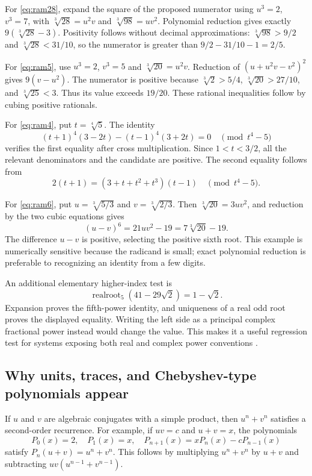 \documentclass[11pt,letterpaper]{article}
\numberwithin{equation}{section}
\theoremstyle{definition}
\theoremstyle{remark}
\begin{document}
For \eqref{eq:ram28}, expand the square of the proposed numerator using $u^3=2$, $v^3=7$, with $\sqrt[3]{28}=u^2v$ and $\sqrt[3]{98}=uv^2$. Polynomial reduction gives exactly $9(\sqrt[3]{28}-3)$. Positivity follows without decimal approximations: $\sqrt[3]{98}>9/2$ and $\sqrt[3]{28}<31/10$, so the numerator is greater than $9/2-31/10-1=2/5$.

For \eqref{eq:ram5}, use $u^3=2$, $v^3=5$ and $\sqrt[3]{20}=u^2v$. Reduction of $(u+u^2v-v^2)^2$ gives $9(v-u^2)$. The numerator is positive because $\sqrt[3]2>5/4$, $\sqrt[3]{20}>27/10$, and $\sqrt[3]{25}<3$. Thus its value exceeds $19/20$. These rational inequalities follow by cubing positive rationals.

For \eqref{eq:ram4}, put $t=\sqrt[4]5$. The identity
\[
(t+1)^4(3-2t)-(t-1)^4(3+2t)=0
\quad\pmod{t^4-5}
\]
verifies the first equality after cross multiplication. Since $1<t<3/2$, all the relevant denominators and the candidate are positive. The second equality follows from
\[
2(t+1)=(3+t+t^2+t^3)(t-1)
\quad\pmod{t^4-5}.
\]

For \eqref{eq:ram6}, put $u=\sqrt[3]{5/3}$ and $v=\sqrt[3]{2/3}$. Then $\sqrt[3]{20}=3uv^2$, and reduction by the two cubic equations gives
\[
(u-v)^6=21uv^2-19=7\sqrt[3]{20}-19.
\]
The difference $u-v$ is positive, selecting the positive sixth root. This example is numerically sensitive because the radicand is small; exact polynomial reduction is preferable to recognizing an identity from a few digits.

An additional elementary higher-index test is
\begin{equation}\label{eq:negativefifth}
\operatorname{realroot}_5(41-29\sqrt2)=1-\sqrt2.
\end{equation}
Expansion proves the fifth-power identity, and uniqueness of a real odd root proves the displayed equality. Writing the left side as a principal complex fractional power instead would change the value. This makes it a useful regression test for systems exposing both real and complex power conventions \cite{maxima}.

\subsection{Why units, traces, and Chebyshev-type polynomials appear}
If $u$ and $v$ are algebraic conjugates with a simple product, then $u^n+v^n$ satisfies a second-order recurrence. For example, if $uv=c$ and $u+v=x$, the polynomials
\[
P_0(x)=2,\quad P_1(x)=x,\quad
P_{n+1}(x)=xP_n(x)-cP_{n-1}(x)
\]
satisfy $P_n(u+v)=u^n+v^n$. This follows by multiplying $u^n+v^n$ by $u+v$ and subtracting $uv(u^{n-1}+v^{n-1})$.
\end{document}
